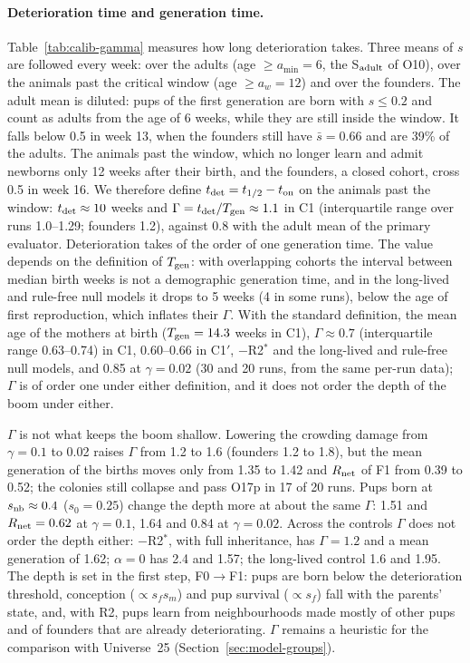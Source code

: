\paragraph{Deterioration time and generation time.}
Table~\ref{tab:calib-gamma} measures how long deterioration takes. Three means of $s$ are followed every week: over the
adults (age $\ge a_{\min}=6$, the S$_{\rm adult}$ of O10), over the animals past the critical window (age $\ge a_w=12$)
and over the founders. The adult mean is diluted: pups of the first generation are born with $s\le0.2$ and count as
adults from the age of 6 weeks, while they are still inside the window. It falls below 0.5 in week 13, when the
founders still have $\bar s=0.66$ and are 39\% of the adults. The animals past the window, which no longer learn and
admit newborns only 12 weeks after their birth, and the founders, a closed cohort, cross 0.5 in week 16. We therefore
define $t_{\rm det}=t_{1/2}-t_{\rm on}$ on the animals past the window: $t_{\rm det}\approx10$ weeks and
$\Gamma=t_{\rm det}/T_{\rm gen}\approx1.1$ in \textsf{C1} (interquartile range over runs 1.0--1.29; founders 1.2),
against 0.8 with the adult mean of the primary evaluator. Deterioration takes of the order of one generation time. The value
depends on the definition of $T_{\rm gen}$: with overlapping cohorts the interval between median birth weeks is not a
demographic generation time, and in the long-lived and rule-free null models it drops to 5 weeks (4 in some runs),
below the age of first reproduction, which inflates their $\Gamma$. With the standard definition, the mean age of the
mothers at birth ($T_{\rm gen}=14.3$ weeks in \textsf{C1}), $\Gamma\approx0.7$ (interquartile range 0.63--0.74) in
\textsf{C1}, 0.60--0.66 in \textsf{C1}$'$, $-$R2$^*$ and the long-lived and rule-free null models, and 0.85 at
$\gamma=0.02$ (30 and 20 runs, from the same per-run data); $\Gamma$ is of order one under either definition, and
it does not order the depth of the boom under either.

$\Gamma$ is not what keeps the boom shallow. Lowering the crowding damage from $\gamma=0.1$ to 0.02 raises $\Gamma$ from
1.2 to 1.6 (founders 1.2 to 1.8), but the mean generation of the births moves only from 1.35 to 1.42 and $R_{\rm net}$
of F1 from 0.39 to 0.52; the colonies still collapse and pass O17p in 17 of 20 runs. Pups born at
$s_{\rm nb}\approx0.4$ ($s_0=0.25$) change the depth more at about the same $\Gamma$: 1.51 and $R_{\rm net}=0.62$ at
$\gamma=0.1$, 1.64 and 0.84 at $\gamma=0.02$. Across the controls $\Gamma$ does not order the depth either: $-$R2$^*$, with
full inheritance, has $\Gamma=1.2$ and a mean generation of 1.62; $\alpha=0$ has 2.4 and 1.57; the long-lived control
1.6 and 1.95. The depth is set in the first
step, F0$\to$F1: pups are born below the deterioration threshold, conception ($\propto s_fs_m$) and pup survival
($\propto s_f$) fall with the parents' state, and, with R2, pups learn from neighbourhoods made mostly of other pups and
of founders that are already deteriorating. $\Gamma$ remains a heuristic for the comparison with Universe~25
(Section~\ref{sec:model-groups}).

